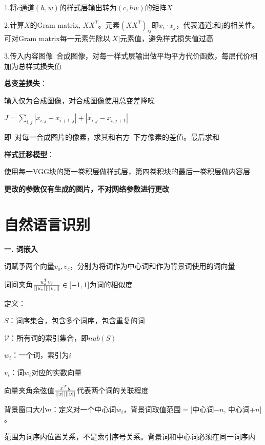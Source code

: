 \documentclass[UTF8]{ctexart}
\begin{document}
  \quad \quad \quad 1.将$c$通道$(h, w)$的样式层输出转为$(c, hw)$的矩阵$X$

  \quad \quad \quad 2.计算$X$的Gram matrix, $XX^T$。元素$(XX^T)_{ij}$即$x_i \cdot x_j$，代表通道i和j的相关性。可对Gram matrix每一元素先除以$|X|$元素值，避免样式损失值过高

  \quad \quad \quad 3.传入内容图像\ 合成图像，对每一样式层输出做平均平方代价函数，每层代价相加为总样式损失值

  \quad \textbf{总变差损失}：

  \quad \quad 输入仅为合成图像，对合成图像使用总变差降噪

  \quad \quad $J = \sum_{i, j} |x_{i,j} - x_{i+1,j}| + |x_{i,j} - x_{i,j+1}|$

  \quad \quad \quad 即\ 对每一合成图片的像素，求其和右方\ 下方像素的差值。最后求和

  \textbf{样式迁移模型}：

  \quad 使用每一VGG块的第一卷积层做样式层，第四卷积块的最后一卷积层做内容层
  
  \quad \textbf{更改的参数仅有生成的图片，不对网络参数进行更改}

\section{自然语言识别}
\noindent \textbf{一. 词嵌入}

  词赋予两个向量$v_o, v_c$，分别为将词作为中心词和作为背景词使用的词向量
  
  \quad 词间夹角$\frac{u_o^Tv_c}{||u_o||\space||v_c||} \in [-1, 1]$为词的相似度

  定义：

  \quad $S$：词序集合，包含多个词序，包含重复的词

  \quad $\mathcal{V} $：所有词的索引集合，即$nub(S)$

  \quad $w_i$：一个词，索引为$i$

  \quad $v_i$：词$w_i$对应的实数向量
  
  \quad \quad 向量夹角余弦值$\frac{x^Ty}{||x||\space ||y||}$代表两个词的关联程度

  \quad 背景窗口大小$n$：定义对一个中心词$w_i$，背景词取值范围$=[$中心词$-n$, 中心词$+n]$。
  
  \quad \quad 范围为词序内位置关系，不是索引序号关系。背景词和中心词必须在同一词序内
\end{document}
